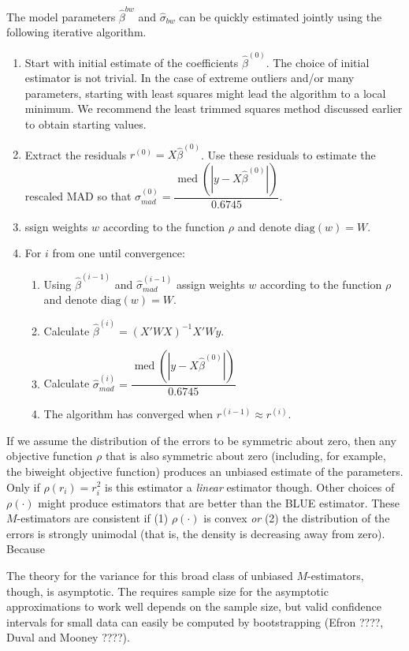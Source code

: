 \documentclass[12pt]{article}
\DeclareMathOperator{\med}{med}
\begin{document}
The model parameters $\hat{\beta}^{bw}$ and $\hat{\sigma}_{bw}$ can be quickly estimated jointly using the following iterative algorithm.
\begin{enumerate}
\item Start with initial estimate of the coefficients $\hat{\beta}^{(0)}$. The choice of initial estimator is not trivial. In the case of extreme outliers and/or many parameters, starting with least squares might lead the algorithm to a local minimum. We recommend the least trimmed squares method discussed earlier to obtain starting values.
\item Extract the residuals $r^{(0)} = X\hat{\beta}^{(0)}$. Use these residuals to estimate the rescaled MAD so that $\hat{\sigma}^{(0)}_{mad} = \dfrac{\med\left( |y - X\hat{\beta}^{(0)}|\right)}{0.6745}$.
\item ssign weights $w$ according to the function $\rho$ and denote $\text{diag}(w) = W$.
\item For $i$ from one until convergence:
        \begin{enumerate}
        \item Using $\hat{\beta}^{(i-1)}$ and $\hat{\sigma}^{(i-1)}_{mad}$ assign weights $w$ according to the function $\rho$ and denote $\text{diag}(w) = W$.
        \item Calculate $\hat{\beta}^{(i)} = (X'WX)^{-1}X'Wy$.
        \item Calculate $\hat{\sigma}^{(i)}_{mad} = \dfrac{\med\left( |y - X\hat{\beta}^{(0)}|\right)}{0.6745}$
        \item The algorithm has converged when $r^{(i-1)} \approx r^{(i)}$.
        \end{enumerate}
\end{enumerate}

If we assume the distribution of the errors to be symmetric about zero, then any objective function $\rho$ that is also symmetric about zero (including, for example, the biweight objective function) produces an unbiased estimate of the parameters. Only if $\rho(r_i) = r_i^2$ is this estimator a \textit{linear} estimator though. Other choices of $\rho(\cdot)$ might produce estimators that are better than the BLUE estimator. These $M$-estimators are consistent if (1) $\rho(\cdot)$ is convex \textit{or} (2) the distribution of the errors is strongly unimodal (that is, the density is decreasing away from zero). Because  

The theory for the variance for this broad class of unbiased $M$-estimators, though, is asymptotic. The requires sample size for the asymptotic approximations to work well depends on the sample size, but valid confidence intervals for small data can easily be computed by bootstrapping (Efron ????, Duval and Mooney ????).
\end{document}
